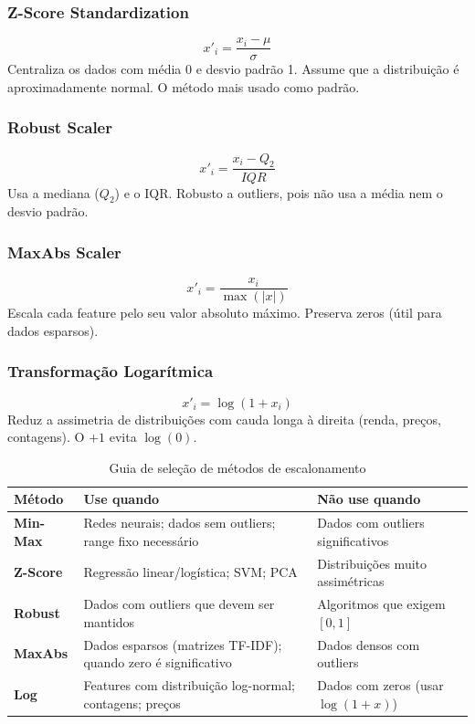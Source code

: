 \documentclass[12pt,a4paper]{article}
\begin{document}
\subsubsection{Z-Score Standardization}
\[
x'_i = \frac{x_i - \mu}{\sigma}
\]
Centraliza os dados com média 0 e desvio padrão 1. Assume que a distribuição é aproximadamente normal. O método mais usado como padrão.

\subsubsection{Robust Scaler}
\[
x'_i = \frac{x_i - Q_2}{IQR}
\]
Usa a mediana ($Q_2$) e o IQR. Robusto a outliers, pois não usa a média nem o desvio padrão.

\subsubsection{MaxAbs Scaler}
\[
x'_i = \frac{x_i}{\max(|x|)}
\]
Escala cada feature pelo seu valor absoluto máximo. Preserva zeros (útil para dados esparsos).

\subsubsection{Transformação Logarítmica}
\[
x'_i = \log(1 + x_i)
\]
Reduz a assimetria de distribuições com cauda longa à direita (renda, preços, contagens). O $+1$ evita $\log(0)$.

\begin{table}[ht]
\centering
\caption{Guia de seleção de métodos de escalonamento}
\label{tab:scaling}
\small
\begin{tabular}{>{\bfseries}p{2.8cm} p{3.5cm} p{5.0cm}}
\toprule
\textbf{Método} & \textbf{Use quando} & \textbf{Não use quando} \\
\midrule
Min-Max & Redes neurais; dados sem outliers; range fixo necessário & Dados com outliers significativos \\
Z-Score & Regressão linear/logística; SVM; PCA & Distribuições muito assimétricas \\
Robust & Dados com outliers que devem ser mantidos & Algoritmos que exigem $[0,1]$ \\
MaxAbs & Dados esparsos (matrizes TF-IDF); quando zero é significativo & Dados densos com outliers \\
Log & Features com distribuição log-normal; contagens; preços & Dados com zeros (usar $\log(1+x)$) \\
\bottomrule
\end{tabular}
\end{table}
\end{document}
